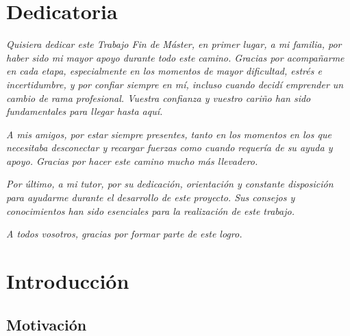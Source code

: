 \documentclass[12pt]{report} %
\begin{document}
\chapter*{Dedicatoria}
\setcounter{page}{5}

\textit{Quisiera dedicar este Trabajo Fin de Máster, en primer lugar, a mi familia, por haber sido mi mayor apoyo durante todo este camino. Gracias por acompañarme en cada etapa, especialmente en los momentos de mayor dificultad, estrés e incertidumbre, y por confiar siempre en mí, incluso cuando decidí emprender un cambio de rama profesional. Vuestra confianza y vuestro cariño han sido fundamentales para llegar hasta aquí.}

\textit{A mis amigos, por estar siempre presentes, tanto en los momentos en los que necesitaba desconectar y recargar fuerzas como cuando requería de su ayuda y apoyo. Gracias por hacer este camino mucho más llevadero.}

\textit{Por último, a mi tutor, por su dedicación, orientación y constante disposición para ayudarme durante el desarrollo de este proyecto. Sus consejos y conocimientos han sido esenciales para la realización de este trabajo.} 

\textit{A todos vosotros, gracias por formar parte de este logro.}

\vfill
\newpage
\thispagestyle{empty}
\mbox{}



\tableofcontents
\thispagestyle{fancy}
\newpage
\thispagestyle{empty}
\mbox{}

\listoffigures
\thispagestyle{fancy}
\newpage
\thispagestyle{empty}
\mbox{}

\listoftables
\thispagestyle{fancy}
\newpage
\thispagestyle{empty}
\mbox{}


\clearpage
{}

\chapter{Introducción}

\section{Motivación}
\end{document}
